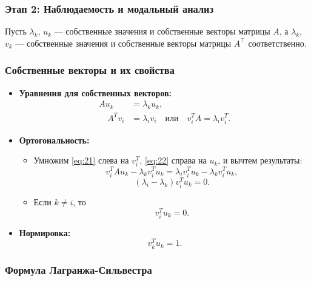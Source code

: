 	\newpage
	
	\subsubsection{Этап 2: Наблюдаемость и модальный анализ}
	Пусть $\lambda_k$, $u_k$ — собственные значения и собственные векторы матрицы $A$, 
	\newline
	а $\lambda_k$, $v_k$ — собственные значения и собственные векторы матрицы $A^\top$ соответственно.
	\vspace{-1em}
	\subsubsection*{Собственные векторы и их свойства}
	
	\begin{itemize}[leftmargin=1em]
		\item \textbf{Уравнения для собственных векторов:}
		\begin{align}
		A u_k &= \lambda_k u_k, \label{eq:21}\\
		\quad A^T v_i &= \lambda_i v_i \quad \text{или} \quad v_i^T A = \lambda_i v_i^T. \label{eq:22}
		\end{align}
		\item \textbf{Ортогональность:}
		\begin{itemize}
			\item Умножим \eqref{eq:21} слева на \(v_i^T\), \eqref{eq:22} справа на \(u_k\), и вычтем результаты:
			\begin{equation}
				v_i^T A u_k - \lambda_k v_i^T u_k = \lambda_i v_i^T u_k - \lambda_k v_i^T u_k,
			\end{equation}
			\begin{equation}
				(\lambda_i - \lambda_k) v_i^T u_k = 0.
			\end{equation}
			\item Если \(k \neq i\), то
			\begin{equation}
				v_i^T u_k = 0. \label{eq:25}
			\end{equation}
		\end{itemize}
		\item \textbf{Нормировка:}
		\begin{equation}
			v_k^T u_k = 1.
		\end{equation}
	\end{itemize}
	
	\subsubsection*{Формула Лагранжа-Сильвестра}
	
